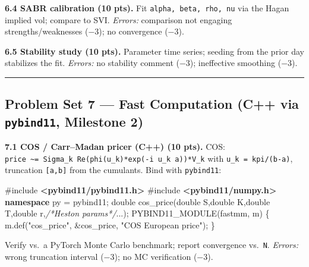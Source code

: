 \documentclass[
]{article}
\newenvironment{Shaded}{}{}
\newcommand{\CommentTok}[1]{\textcolor[rgb]{0.38,0.63,0.69}{\textit{#1}}}
\newcommand{\DataTypeTok}[1]{\textcolor[rgb]{0.56,0.13,0.00}{#1}}
\newcommand{\ImportTok}[1]{\textcolor[rgb]{0.00,0.50,0.00}{\textbf{#1}}}
\newcommand{\KeywordTok}[1]{\textcolor[rgb]{0.00,0.44,0.13}{\textbf{#1}}}
\newcommand{\NormalTok}[1]{#1}
\newcommand{\OperatorTok}[1]{\textcolor[rgb]{0.40,0.40,0.40}{#1}}
\newcommand{\PreprocessorTok}[1]{\textcolor[rgb]{0.74,0.48,0.00}{#1}}
\newcommand{\StringTok}[1]{\textcolor[rgb]{0.25,0.44,0.63}{#1}}
\begin{document}
\textbf{6.4 SABR calibration (10 pts).} Fit
\texttt{alpha,\ beta,\ rho,\ nu} via the Hagan implied vol; compare to
SVI. \emph{Errors:} comparison not engaging strengths/weaknesses (−3);
no convergence (−3).

\textbf{6.5 Stability study (10 pts).} Parameter time series; seeding
from the prior day stabilizes the fit. \emph{Errors:} no stability
comment (−3); ineffective smoothing (−3).

\begin{center}\rule{0.5\linewidth}{0.5pt}\end{center}

\subsection{\texorpdfstring{Problem Set 7 --- Fast Computation (C++ via
\texttt{pybind11}, Milestone
2)}{Problem Set 7 --- Fast Computation (C++ via pybind11, Milestone 2)}}\label{problem-set-7-fast-computation-c-via-pybind11-milestone-2}

\textbf{7.1 COS / Carr--Madan pricer (C++) (10 pts).} COS:
\texttt{price\ \textasciitilde{}=\ Sigma\_k\ Re(phi(u\_k)*exp(-i\ u\_k\ a))*V\_k}
with \texttt{u\_k\ =\ kpi/(b-a)}, truncation \texttt{{[}a,b{]}} from the
cumulants. Bind with \texttt{pybind11}:

\begin{Shaded}
\begin{Highlighting}[]
\PreprocessorTok{\#include }\ImportTok{\textless{}pybind11/pybind11.h\textgreater{}}
\PreprocessorTok{\#include }\ImportTok{\textless{}pybind11/numpy.h\textgreater{}}
\KeywordTok{namespace}\NormalTok{ py }\OperatorTok{=}\NormalTok{ pybind11}\OperatorTok{;}
\DataTypeTok{double}\NormalTok{ cos\_price}\OperatorTok{(}\DataTypeTok{double}\NormalTok{ S}\OperatorTok{,}\DataTypeTok{double}\NormalTok{ K}\OperatorTok{,}\DataTypeTok{double}\NormalTok{ T}\OperatorTok{,}\DataTypeTok{double}\NormalTok{ r}\OperatorTok{,}\CommentTok{/*Heston params*/}\OperatorTok{...);}
\NormalTok{PYBIND11\_MODULE}\OperatorTok{(}\NormalTok{fastmm}\OperatorTok{,}\NormalTok{ m}\OperatorTok{)} \OperatorTok{\{}
\NormalTok{    m}\OperatorTok{.}\NormalTok{def}\OperatorTok{(}\StringTok{"cos\_price"}\OperatorTok{,} \OperatorTok{\&}\NormalTok{cos\_price}\OperatorTok{,} \StringTok{"COS European price"}\OperatorTok{);}
\OperatorTok{\}}
\end{Highlighting}
\end{Shaded}

Verify vs.~a PyTorch Monte Carlo benchmark; report convergence
vs.~\texttt{N}. \emph{Errors:} wrong truncation interval (−3); no MC
verification (−3).
\end{document}
